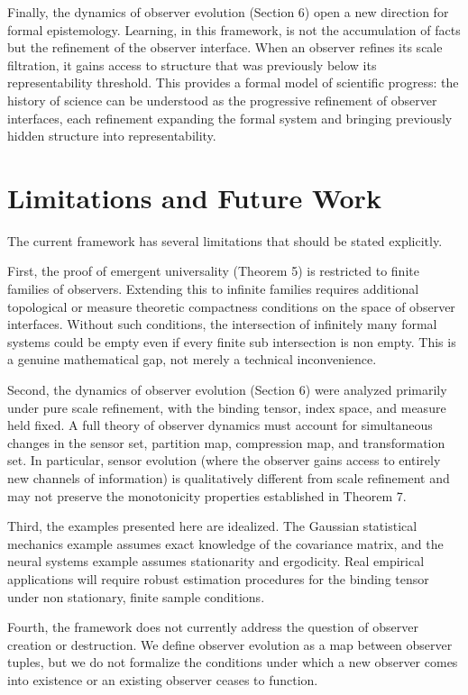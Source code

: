\documentclass[12pt]{article}
\theoremstyle{definition}
\begin{document}
Finally, the dynamics of observer evolution (Section 6) open a new direction for formal epistemology. Learning, in this framework, is not the accumulation of facts but the refinement of the observer interface. When an observer refines its scale filtration, it gains access to structure that was previously below its representability threshold. This provides a formal model of scientific progress: the history of science can be understood as the progressive refinement of observer interfaces, each refinement expanding the formal system and bringing previously hidden structure into representability.

\section{Limitations and Future Work}

The current framework has several limitations that should be stated explicitly.

First, the proof of emergent universality (Theorem 5) is restricted to finite families of observers. Extending this to infinite families requires additional topological or measure theoretic compactness conditions on the space of observer interfaces. Without such conditions, the intersection of infinitely many formal systems could be empty even if every finite sub intersection is non empty. This is a genuine mathematical gap, not merely a technical inconvenience.

Second, the dynamics of observer evolution (Section 6) were analyzed primarily under pure scale refinement, with the binding tensor, index space, and measure held fixed. A full theory of observer dynamics must account for simultaneous changes in the sensor set, partition map, compression map, and transformation set. In particular, sensor evolution (where the observer gains access to entirely new channels of information) is qualitatively different from scale refinement and may not preserve the monotonicity properties established in Theorem 7.

Third, the examples presented here are idealized. The Gaussian statistical mechanics example assumes exact knowledge of the covariance matrix, and the neural systems example assumes stationarity and ergodicity. Real empirical applications will require robust estimation procedures for the binding tensor under non stationary, finite sample conditions.

Fourth, the framework does not currently address the question of observer creation or destruction. We define observer evolution as a map between observer tuples, but we do not formalize the conditions under which a new observer comes into existence or an existing observer ceases to function.
\end{document}
